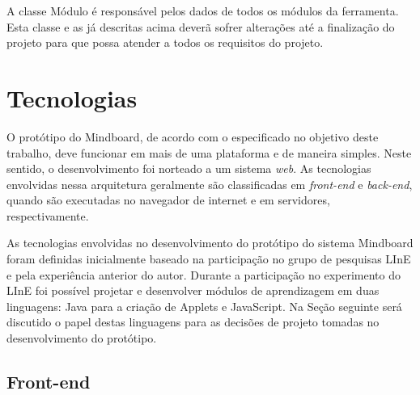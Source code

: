 A classe Módulo é responsável pelos dados de todos os módulos da ferramenta. Esta classe e as já descritas acima deverã sofrer alterações até a finalização do projeto para que possa atender a todos os requisitos do projeto. 

\section{Tecnologias}
\label{sec:tecnologias}

O protótipo do Mindboard, de acordo com o especificado no objetivo deste trabalho, deve funcionar em mais de uma plataforma e de maneira simples. Neste sentido, o desenvolvimento foi norteado a um sistema \emph{web}. As tecnologias envolvidas nessa arquitetura geralmente são classificadas em \emph{front-end} e \emph{back-end}, quando são executadas no navegador de internet e em servidores, respectivamente.

As tecnologias envolvidas no desenvolvimento do protótipo do sistema Mindboard foram definidas inicialmente baseado na participação no grupo de pesquisas LInE e pela experiência anterior do autor. Durante a participação no experimento do LInE foi possível projetar e desenvolver módulos de aprendizagem em duas linguagens: Java para a criação de Applets e JavaScript. Na Seção seguinte será discutido o papel destas linguagens para as decisões de projeto tomadas no desenvolvimento do protótipo.

\subsection{Front-end}
\label{sec:frontend}

